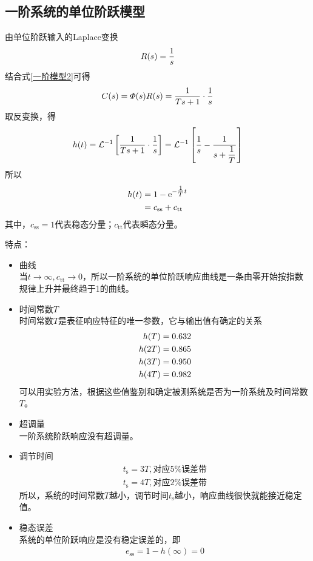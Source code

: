\subsection{一阶系统的单位阶跃模型}
由单位阶跃输入的Laplace变换
\begin{align}
	R(s) = \dfrac{1}{s}\notag
\end{align}
结合式\eqref{一阶模型2}可得
\begin{align}
	C(s) = \varPhi(s) R(s) = \dfrac{1}{Ts+1}\cdot\dfrac{1}{s}\notag
\end{align}
取反变换，得
\begin{align}
	h(t) = \mathcal{L}^{-1}\left[\dfrac{1}{Ts+1}\cdot\dfrac{1}{s}\right] =  \mathcal{L}^{-1}\left[\dfrac{1}{s} - \dfrac{1}{s + \dfrac{1}{T}}\right] \notag
\end{align}
所以
\begin{align}
	h(t) &= 1 - {\rm{e}} ^{ -{\textstyle \frac{1}{T}} t}\\
			&= c_{\text{ss}} + c_{\text{tt}}
\end{align}
其中，$c_{\text{ss}} = 1$代表稳态分量；$c_{\text{tt}}$代表瞬态分量。

\noindent 特点：\vspace*{-0.5em}
\begin{itemize}
	\item 曲线\\
	\hspace*{2em}当$t \to \infty,c_{\text{tt}}\to 0$，所以一阶系统的单位阶跃响应曲线是一条由零开始按指数规律上升并最终趋于1的曲线。 
	\item 时间常数$T$\\
	\hspace*{2em}时间常数$T$是表征响应特征的唯一参数，它与输出值有确定的关系
	\begin{align}
		h(T) &= 0.632\notag\\
		h(2T) &= 0.865\notag\\
		h(3T) &= 0.950 \notag\\
		h(4T) &= 0.982\notag
	\end{align}
	可以用实验方法，根据这些值鉴别和确定被测系统是否为一阶系统及时间常数$T$。
	\item 超调量\\
	\hspace*{2em} 一阶系统阶跃响应没有超调量。
	\item 调节时间
	\begin{align}
		t_{\text{s}} = 3 T,\mbox{对应}5\% \mbox{误差带}\\
		t_{\text{s}} = 4 T,\mbox{对应}2\% \mbox{误差带}
	\end{align}
	所以，系统的时间常数$T$越小，调节时间$t_{\text{s}}$越小，响应曲线很快就能接近稳定值。
	\item 稳态误差\\
	\hspace*{2em}系统的单位阶跃响应是没有稳定误差的，即
	\begin{align}
		e_{\text{ss}} = 1 - h(\infty) = 0
	\end{align}
\end{itemize}

